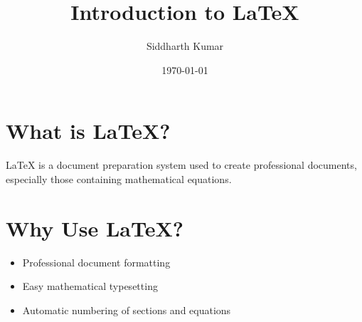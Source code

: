 \documentclass{article}
\title{Introduction to LaTeX}
\author{Siddharth Kumar}
\date{\today}
\begin{document}
\maketitle

\section{What is LaTeX?}

LaTeX is a document preparation system used to create
professional documents, especially those containing
mathematical equations.

\section{Why Use LaTeX?}

\begin{itemize}
    \item Professional document formatting
    \item Easy mathematical typesetting
    \item Automatic numbering of sections and equations
\end{itemize}
\end{document}
